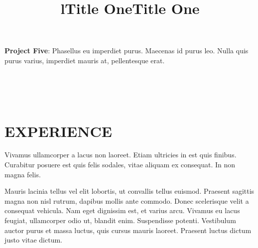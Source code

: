 \documentclass[margin]{res}
\begin{document}
\begin{resume}
\par
\textbf{Project Five}: 
Phasellus eu imperdiet purus. Maecenas id purus leo. Nulla quis purus varius, 
imperdiet mauris at, pellentesque erat. 

\begin{format}
\title{l}\\
\\
\body\\
\end{format}

\section{EXPERIENCE}
\title{\textbf{Title One}}
\begin{position}
Vivamus ullamcorper a lacus non laoreet. Etiam ultricies in est quis finibus. 
Curabitur posuere est quis felis sodales, vitae aliquam ex consequat. In non 
magna felis.
\end{position}

\title{\textbf{Title One}}
\begin{position}
Mauris lacinia tellus vel elit lobortis, ut convallis tellus euismod. Praesent 
sagittis magna non nisl rutrum, dapibus mollis ante commodo. Donec scelerisque 
velit a consequat vehicula. Nam eget dignissim est, et varius arcu. Vivamus eu 
lacus feugiat, ullamcorper odio ut, blandit enim. Suspendisse potenti. 
Vestibulum auctor purus et massa luctus, quis cursus mauris laoreet. Praesent 
luctus dictum justo vitae dictum.
\end{position}
\end{resume}
\end{document}
